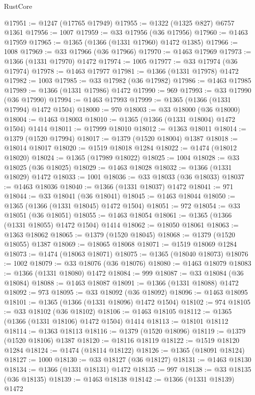\begin{lexlean}{RustCore}
\begin{coremodule}
@17951 := @1247 (@17765 @17949)
@17955 := @1322 (@1325 @827) @6757 @1361
@17956 := 1007
@17959 := @33 @17956 (@36 @17956)
@17960 := @1463 @17959
@17965 := @1365 (@1366 (@1331 @17960) @1472 @1385)
@17966 := 1008
@17969 := @33 @17966 (@36 @17966)
@17970 := @1463 @17969
@17973 := @1366 (@1331 @17970) @1472
@17974 := 1005
@17977 := @33 @17974 (@36 @17974)
@17978 := @1463 @17977
@17981 := @1366 (@1331 @17978) @1472
@17982 := 1003
@17985 := @33 @17982 (@36 @17982)
@17986 := @1463 @17985
@17989 := @1366 (@1331 @17986) @1472
@17990 := 969
@17993 := @33 @17990 (@36 @17990)
@17994 := @1463 @17993
@17999 := @1365 (@1366 (@1331 @17994) @1472 @1504)
@18000 := 970
@18003 := @33 @18000 (@36 @18000)
@18004 := @1463 @18003
@18010 := @1365 (@1366 (@1331 @18004) @1472 @1504) @1414
@18011 := @17999 @18010
@18012 := @1363 @18011
@18014 := @1379 (@1520 @17994)
@18017 := @1379 (@1520 @18004) @1387
@18018 := @18014 @18017
@18020 := @1519 @18018 @1284
@18022 := @1474 (@18012 @18020)
@18024 := @1365 (@17989 @18022)
@18025 := 1004
@18028 := @33 @18025 (@36 @18025)
@18029 := @1463 @18028
@18032 := @1366 (@1331 @18029) @1472
@18033 := 1001
@18036 := @33 @18033 (@36 @18033)
@18037 := @1463 @18036
@18040 := @1366 (@1331 @18037) @1472
@18041 := 971
@18044 := @33 @18041 (@36 @18041)
@18045 := @1463 @18044
@18050 := @1365 (@1366 (@1331 @18045) @1472 @1504)
@18051 := 972
@18054 := @33 @18051 (@36 @18051)
@18055 := @1463 @18054
@18061 := @1365 (@1366 (@1331 @18055) @1472 @1504) @1414
@18062 := @18050 @18061
@18063 := @1363 @18062
@18065 := @1379 (@1520 @18045)
@18068 := @1379 (@1520 @18055) @1387
@18069 := @18065 @18068
@18071 := @1519 @18069 @1284
@18073 := @1474 (@18063 @18071)
@18075 := @1365 (@18040 @18073)
@18076 := 1002
@18079 := @33 @18076 (@36 @18076)
@18080 := @1463 @18079
@18083 := @1366 (@1331 @18080) @1472
@18084 := 999
@18087 := @33 @18084 (@36 @18084)
@18088 := @1463 @18087
@18091 := @1366 (@1331 @18088) @1472
@18092 := 973
@18095 := @33 @18092 (@36 @18092)
@18096 := @1463 @18095
@18101 := @1365 (@1366 (@1331 @18096) @1472 @1504)
@18102 := 974
@18105 := @33 @18102 (@36 @18102)
@18106 := @1463 @18105
@18112 := @1365 (@1366 (@1331 @18106) @1472 @1504) @1414
@18113 := @18101 @18112
@18114 := @1363 @18113
@18116 := @1379 (@1520 @18096)
@18119 := @1379 (@1520 @18106) @1387
@18120 := @18116 @18119
@18122 := @1519 @18120 @1284
@18124 := @1474 (@18114 @18122)
@18126 := @1365 (@18091 @18124)
@18127 := 1000
@18130 := @33 @18127 (@36 @18127)
@18131 := @1463 @18130
@18134 := @1366 (@1331 @18131) @1472
@18135 := 997
@18138 := @33 @18135 (@36 @18135)
@18139 := @1463 @18138
@18142 := @1366 (@1331 @18139) @1472

\end{coremodule}
\end{lexlean}
